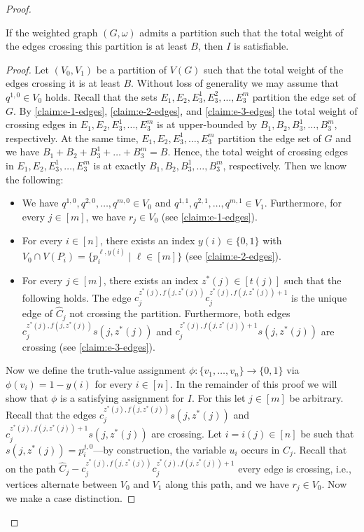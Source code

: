 \documentclass[a4paper,UKenglish,cleveref, autoref, thm-restate]{lipics-v2021}
\begin{document}
\begin{proof}
    \begin{claim}
        If the weighted graph $(G, \omega)$ admits a partition such that the total weight of the edges crossing this partition is at least $B$, then $I$ is satisfiable.
    \end{claim}
    \begin{proof}
        Let $(V_0, V_1)$ be a partition of $V(G)$ such that the total weight of the edges crossing it is at least $B$.
        Without loss of generality we may assume that $q^{1,0} \in V_0$ holds.
        Recall that the sets $E_1, E_2, E_3^1, E_3^2, \dots, E_3^m$ partition the edge set of $G$.
        By \cref{claim:e-1-edges}, \cref{claim:e-2-edges}, and \cref{claim:e-3-edges} the total weight of crossing edges in $E_1, E_2, E_3^1, \dots, E_3^m$ is at upper-bounded by $B_1, B_2, B_3^1, \dots, B_3^m$, respectively.
        At the same time, $E_1, E_2, E_3^1, \dots, E_3^m$ partition the edge set of $G$ and we have $B_1 + B_2 + B_3^1 + \dots + B_3^m = B$.
        Hence, the total weight of crossing edges in $E_1, E_2, E_3^1, \dots, E_3^m$ is at exactly $B_1, B_2, B_3^1, \dots, B_3^m$, respectively.
        Then we know the following:
        \begin{itemize}
            \item 
            We have $q^{1,0}, q^{2,0}, \dots, q^{m,0} \in V_0$ and $q^{1,1}, q^{2,1}, \dots, q^{m,1} \in V_1$.
            Furthermore, for every $j \in [m]$, we have $r_j \in V_0$ (see \cref{claim:e-1-edges}).

            \item For every $i \in [n]$, there exists an index $y(i) \in \{0,1\}$ with $V_0 \cap V(P_i) = \{p_i^{\ell, y(i)} \mid \ell \in [m]\}$ (see \cref{claim:e-2-edges}).

            \item For every $j \in [m]$, there exists an index $z^*(j) \in [t(j)]$ such that the following holds.
            The edge $c_j^{z^*(j), f(j, z^*(j))} c_j^{z^*(j), f(j, z^*(j))+1}$ is the unique edge of $\hat{C}_j$ not crossing the partition. 
            Furthermore, both edges $c_j^{z^*(j), f(j,z^*(j))} s(j,z^*(j))$ and $c_j^{z^*(j), f(j,z^*(j))+1} s(j,z^*(j))$ are crossing (see \cref{claim:e-3-edges}).
        \end{itemize}
        
        Now we define the truth-value assignment $\phi \colon \{v_1, \dots, v_n\} \to \{0, 1\}$ via $\phi(v_i) = 1 - y(i)$ for every $i \in [n]$.
        In the remainder of this proof we will show that $\phi$ is a satisfying assignment for $I$.
        For this let $j \in [m]$ be arbitrary.
        Recall that the edges $c_j^{z^*(j), f(j,z^*(j))} s(j,z^*(j))$ and $c_j^{z^*(j), f(j,z^*(j))+1} s(j,z^*(j))$ are crossing.
        Let $i = i(j) \in [n]$ be such that $s(j,z^*(j)) = p_i^{j,0}$---by construction, the variable $u_i$ occurs in $C_j$.        
        Recall that on the path $\hat C_j - c_j^{z^*(j), f(j, z^*(j))} c_j^{z^*(j), f(j, z^*(j))+1}$ every edge is crossing, i.e., vertices alternate between $V_0$ and $V_1$ along this path, and we have $r_j \in V_0$.
        Now we make a case distinction.


\end{proof}
\end{proof}
\end{document}
